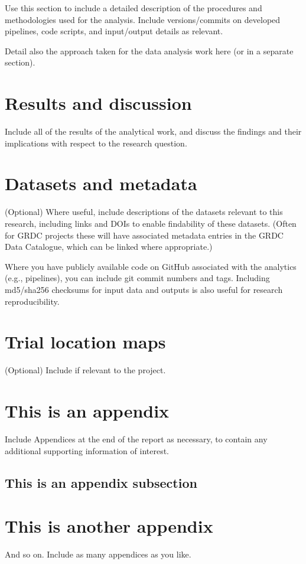 \documentclass[12pt]{article}
\begin{document}
  Use this section to include a detailed description of the procedures and
  methodologies used for the analysis. Include versions/commits on developed
  pipelines, code scripts, and input/output details as relevant.
  
  Detail also the approach taken for the data analysis work here (or in a
  separate section).
  
  \clearpage
  \section{Results and discussion}
  
  Include all of the results of the analytical work, and discuss the findings
  and their implications with respect to the research question.
  
  \clearpage
  \section{Datasets and metadata}
  
  (Optional) Where useful, include descriptions of the datasets relevant to
  this research, including links and DOIs to enable findability of these datasets.
  (Often for GRDC projects these will have associated metadata entries in the GRDC
  Data Catalogue, which can be linked where appropriate.)
  
  Where you have publicly available code on GitHub associated with the analytics
  (e.g., pipelines), you can include git commit numbers and tags. Including
  md5/sha256 checksums for input data and outputs is also useful for
  research reproducibility.
  
  \clearpage
  \section{Trial location maps}
  
  (Optional) Include if relevant to the project.
    
  
  \clearpage
  \begin{appendices}
    \clearpage
    \section{This is an appendix}
    
    Include Appendices at the end of the report as necessary, to contain any
    additional supporting information of interest.
    
    \subsection{This is an appendix subsection}

    \clearpage
    \section{This is another appendix}
    And so on. Include as many appendices as you like.    
    
  \end{appendices}

  \clearpage
  \pagestyle{bibliography}
  
  
\end{document}

